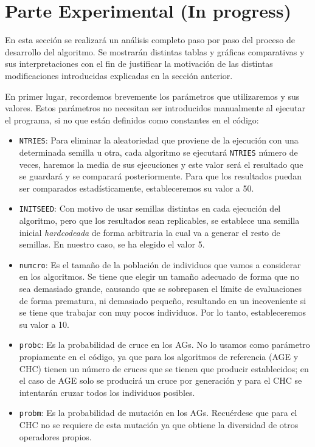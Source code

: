 \chapter{Parte Experimental (In progress)}

En esta sección se realizará un análisis completo paso por paso del proceso de desarrollo del algoritmo. 
Se mostrarán distintas tablas y gráficas comparativas y sus interpretaciones con el fin de justificar la motivación de las distintas modificaciones introducidas explicadas en la sección anterior.

En primer lugar, recordemos brevemente los parámetros que utilizaremos y sus valores. 
Estos parámetros no necesitan ser introducidos manualmente al ejecutar el programa, si no que están definidos como constantes en el código:

\begin{itemize}
	\item \texttt{NTRIES}: Para eliminar la aleatoriedad que proviene de la ejecución con una determinada semilla u otra, cada algoritmo se ejecutará \texttt{NTRIES} número de veces, haremos la media de sus ejecuciones y este valor será el resultado que se guardará y se comparará posteriormente. 
	Para que los resultados puedan ser comparados estadísticamente, estableceremos su valor a 50.
	\item \texttt{INITSEED}: Con motivo de usar semillas distintas en cada ejecución del algoritmo, pero que los resultados sean replicables, se establece una semilla inicial \textit{hardcodeada} de forma arbitraria la cual va a generar el resto de semillas. 
	En nuestro caso, se ha elegido el valor 5. 
	\item \texttt{numcro}: Es el tamaño de la población de individuos que vamos a considerar en los algoritmos. 
	Se tiene que elegir un tamaño adecuado de forma que no sea demasiado grande, causando que se sobrepasen el límite de evaluaciones de forma prematura, ni demasiado pequeño, resultando en un incoveniente si se tiene que trabajar con muy pocos individuos. 
	Por lo tanto, estableceremos su valor a 10.
	\item \texttt{probc}: Es la probabilidad de cruce en los AGs. 
	No lo usamos como parámetro propiamente en el código, ya que para los algoritmos de referencia (AGE y CHC) tienen un número de cruces que se tienen que producir establecidos; en el caso de AGE solo se producirá un cruce por generación y para el CHC se intentarán cruzar todos los individuos posibles. 
	\item \texttt{probm}: Es la probabilidad de mutación en los AGs. Recuérdese que para el CHC no se requiere de esta mutación ya que obtiene la diversidad de otros operadores propios. 

\end{itemize}
